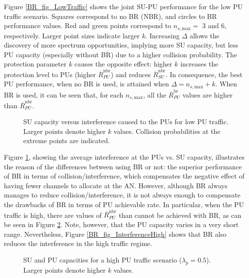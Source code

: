 Figure \ref{BR_fig_LowTraffic} shows the joint SU-PU performance for the low PU traffic scenario.
Squares correspond to no BR (NBR), and circles to BR performance values. Red and green points correspond to $n_{s,\text{max}}=$ 3 and 6, respectively. 
Larger point sizes indicate larger $k$.
Increasing $\Delta$ allows the discovery of more spectrum opportunities, implying more SU capacity, but less PU capacity (especially without BR) due to a higher collision probability. 
The protection parameter $k$ causes the opposite effect: higher $k$ increases the protection level to PUs (higher $\overline{R}^{\text{nbr}}_{PU}$) and reduces $\overline{R}^{\text{nbr}}_{SU}$. In consequence, the best PU performance, when no BR is used, is attained when $\Delta=n_{s,\text{max}}+k$.
When BR is used, it can be seen that, for each $n_{s,\text{max}}$, all the $\overline{R}^{\text{br}}_{PU}$ values are higher than $\overline{R}^{\text{nbr}}_{PU}$.
\begin{figure}
\begin{center}
\resizebox{9cm}{!}{}
\end{center}
\caption{SU capacity versus interference caused to the PUs for low PU traffic. Larger points denote higher $k$ values. Collision probabilities at the extreme points are indicated.}\label{BR_fig_Interference}
\end{figure}
Figure \ref{BR_fig_Interference}, showing the average interference at the PUs vs. SU capacity, illustrates the reason of the differences between using BR or not: the superior performance of BR in terms of collision/interference, which compensates the negative effect of having fewer channels to allocate at the AN.
However, although BR always manages to reduce collision/interference, it is not always enough to compensate the drawbacks of BR in terms of PU achievable rate. In particular, when the PU traffic is high, there are values of $\overline{R}^{\text{nbr}}_{PU}$ than cannot be achieved with BR, as can be seen in Figure \ref{BR_fig_HighTraffic}. Note, however, that the PU capacity varies in a very short range. Nevertheless, Figure \ref{BR_fig_InterferenceHigh} shows that BR also reduces the interference in the high traffic regime.

\begin{figure}
\begin{center}
\resizebox{9cm}{!}{}
\end{center}
\caption{SU and PU capacities for a high PU traffic scenario ($\lambda_{p}=0.5$). Larger points denote higher $k$ values.}\label{BR_fig_HighTraffic}
\end{figure}

